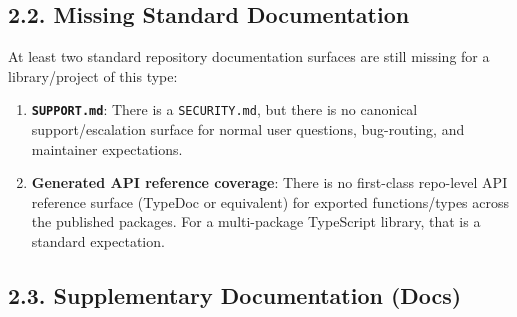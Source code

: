 \subsection{2.2. Missing Standard Documentation}\label{record-417-missing-standard-documentation}

At least two standard repository documentation surfaces are still missing for a library/project of this type:

\begin{enumerate}
\def\labelenumi{\arabic{enumi}.}
\tightlist
\item
  \textbf{\texttt{S\allowbreak{}U\allowbreak{}P\allowbreak{}P\allowbreak{}O\allowbreak{}R\allowbreak{}T\allowbreak{}.\allowbreak{}m\allowbreak{}d}}: There is a \texttt{S\allowbreak{}E\allowbreak{}C\allowbreak{}U\allowbreak{}R\allowbreak{}I\allowbreak{}T\allowbreak{}Y\allowbreak{}.\allowbreak{}m\allowbreak{}d}, but there is no canonical support/escalation surface for normal user questions, bug-routing, and maintainer expectations.
\item
  \textbf{Generated API reference coverage}: There is no first-class repo-level API reference surface (TypeDoc or equivalent) for exported functions/types across the published packages. For a multi-package TypeScript library, that is a standard expectation.
\end{enumerate}

\subsection{2.3. Supplementary Documentation (Docs)}\label{record-417-supplementary-documentation-docs}

